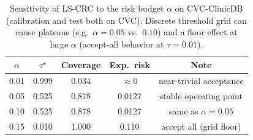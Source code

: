 
\begin{table}[t]
  \centering
  \caption{Sensitivity of LS-CRC to the risk budget $\alpha$ on CVC-ClinicDB (calibration and test both on CVC). Discrete threshold grid can cause plateaus (e.g.\ $\alpha=0.05$ vs.\ $0.10$) and a floor effect at large $\alpha$ (accept-all behavior at $\tau\!=\!0.01$).}
  \label{tab:lscrc-sweep-cvc}
  \begin{tabular}{@{}ccccc@{}}
    \toprule
    $\alpha$ & $\tau^\star$ & Coverage & Exp.\ risk & Note \\
    \midrule
    0.01 & 0.999 & 0.034 & $\approx$0 & near-trivial acceptance \\
    0.05 & 0.525 & 0.878 & 0.0127 & stable operating point \\
    0.10 & 0.525 & 0.878 & 0.0127 & same as $\alpha=0.05$ \\
    0.15 & 0.010 & 1.000 & 0.110 & accept all (grid floor) \\
    \bottomrule
  \end{tabular}
\end{table}
